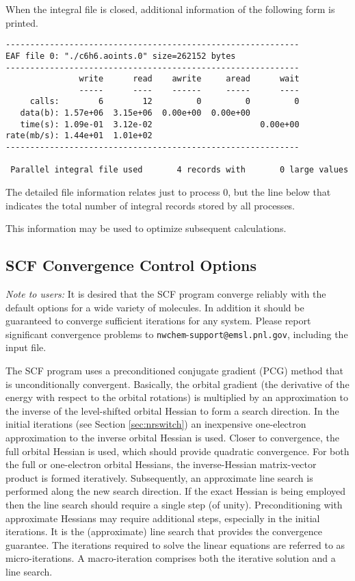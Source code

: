 When the integral file is closed, additional information of the following
form is printed.

\begin{verbatim}
------------------------------------------------------------
EAF file 0: "./c6h6.aoints.0" size=262152 bytes
------------------------------------------------------------
               write      read    awrite     aread      wait
               -----      ----    ------     -----      ----
     calls:        6        12         0         0         0
   data(b): 1.57e+06  3.15e+06  0.00e+00  0.00e+00
   time(s): 1.09e-01  3.12e-02                      0.00e+00
rate(mb/s): 1.44e+01  1.01e+02
------------------------------------------------------------

 Parallel integral file used       4 records with       0 large values
\end{verbatim}
The detailed file information relates just to process 0, but the 
line below that indicates the total number of integral records stored
by all processes.  

This information may be used to optimize subsequent calculations.


\subsection{SCF Convergence Control Options}
\label{sec:scfconv}

{\em Note to users:} It is desired that the SCF program converge
reliably with the default options for a wide variety of molecules.  In
addition it should be guaranteed to converge sufficient iterations for
any system.  Please report significant convergence problems to
\verb+nwchem+-\verb+support@+\-\verb+emsl.pnl.gov+, including the
input file. 


The SCF program uses a preconditioned conjugate gradient (PCG) method
that is unconditionally convergent.  Basically, the orbital gradient
(the derivative of the energy with respect to the orbital rotations)
is multiplied by an approximation to the inverse of the level-shifted
orbital Hessian to form a search direction.  In the initial iterations
(see Section \ref{sec:nrswitch}) an inexpensive one-electron
approximation to the inverse orbital Hessian is used.  Closer to
convergence, the full orbital Hessian is used, which should provide
quadratic convergence.  For both the full or one-electron orbital
Hessians, the inverse-Hessian matrix-vector product is formed
iteratively.  Subsequently, an approximate line search is performed
along the new search direction.  If the exact Hessian is being
employed then the line search should require a single step (of unity).
Preconditioning with approximate Hessians may require additional
steps, especially in the initial iterations.  It is the (approximate)
line search that provides the convergence guarantee.  The iterations
required to solve the linear equations are referred to as
micro-iterations.  A macro-iteration comprises both the iterative
solution and a line search.

